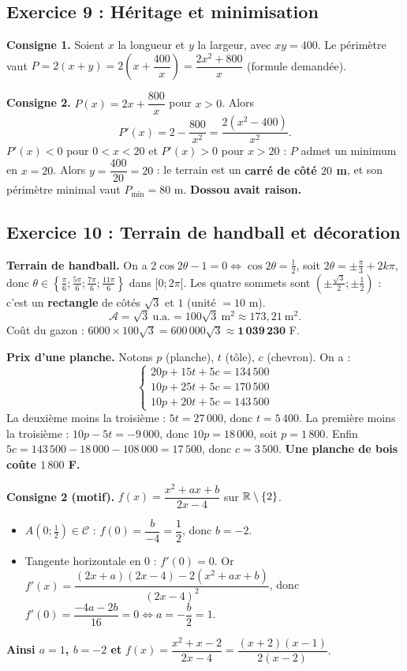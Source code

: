 \subsection{Exercice 9 : H\'eritage et minimisation}

\textbf{Consigne 1.} Soient $x$ la longueur et $y$ la largeur, avec $xy=400$. Le p\'erim\`etre vaut
$P=2(x+y)=2\left(x+\dfrac{400}{x}\right)=\dfrac{2x^2+800}{x}$ (formule demand\'ee).

\textbf{Consigne 2.} $P(x)=2x+\dfrac{800}{x}$ pour $x>0$. Alors
\[
P'(x)=2-\frac{800}{x^2}=\frac{2(x^2-400)}{x^2}.
\]
$P'(x)<0$ pour $0<x<20$ et $P'(x)>0$ pour $x>20$ : $P$ admet un minimum en $x=20$.
Alors $y=\dfrac{400}{20}=20$ : le terrain est un \textbf{carr\'e de c\^ot\'e $20$ m}, et son p\'erim\`etre minimal vaut $P_{\min}=80$ m.
\textbf{Dossou avait raison.}

\subsection{Exercice 10 : Terrain de handball et d\'ecoration}

\textbf{Terrain de handball.} On a $2\cos2\theta-1=0\iff\cos2\theta=\frac12$, soit $2\theta=\pm\frac{\pi}{3}+2k\pi$,
donc $\theta\in\left\{\frac{\pi}{6};\frac{5\pi}{6};\frac{7\pi}{6};\frac{11\pi}{6}\right\}$ dans $[0;2\pi[$.
Les quatre sommets sont $(\pm\frac{\sqrt3}{2};\pm\frac12)$ : c'est un \textbf{rectangle} de c\^ot\'es $\sqrt3$ et $1$ (unit\'e $=10$ m).
\[
\mathcal A=\sqrt3\ \text{u.a.}=100\sqrt3\ \text{m}^2\approx173{,}21\ \text{m}^2.
\]
Co\^ut du gazon : $6000\times100\sqrt3=600\,000\sqrt3\approx\mathbf{1\,039\,230}$ F.

\medskip\noindent\textbf{Prix d'une planche.} Notons $p$ (planche), $t$ (t\^ole), $c$ (chevron). On a :
\[
\begin{cases}
20p+15t+5c=134\,500\\
10p+25t+5c=170\,500\\
10p+20t+5c=143\,500
\end{cases}
\]
La deuxi\`eme moins la troisi\`eme : $5t=27\,000$, donc $t=5\,400$.
La premi\`ere moins la troisi\`eme : $10p-5t=-9\,000$, donc $10p=18\,000$, soit $p=1\,800$.
Enfin $5c=143\,500-18\,000-108\,000=17\,500$, donc $c=3\,500$.
\textbf{Une planche de bois co\^ute $1\,800$ F.}

\medskip\noindent\textbf{Consigne 2 (motif).} $f(x)=\dfrac{x^2+ax+b}{2x-4}$ sur $\mathbb{R}\setminus\{2\}$.
\begin{itemize}
  \item $A(0;\frac12)\in\mathcal C$ : $f(0)=\dfrac{b}{-4}=\dfrac12$, donc $b=-2$.
  \item Tangente horizontale en $0$ : $f'(0)=0$. Or $f'(x)=\dfrac{(2x+a)(2x-4)-2(x^2+ax+b)}{(2x-4)^2}$,
  donc $f'(0)=\dfrac{-4a-2b}{16}=0\iff a=-\dfrac{b}{2}=1$.
\end{itemize}
\textbf{Ainsi $a=1$, $b=-2$ et} $f(x)=\dfrac{x^2+x-2}{2x-4}=\dfrac{(x+2)(x-1)}{2(x-2)}$.

